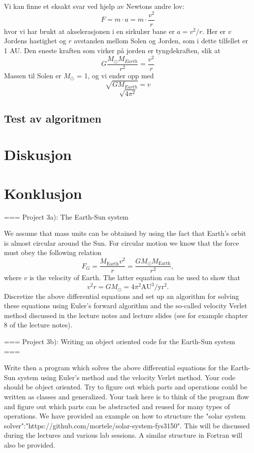 \documentclass[11pt,a4paper]{article}
\begin{document}
Vi kan finne et eksakt svar ved hjelp av Newtons andre lov:
\[F = m\cdot a = m \cdot\frac{v^2}{r} \]
hvor vi har brukt at akselerasjonen i en sirkulær bane er $a=v^2/r$. Her er $v$ Jordens hastighet og $r$ avstanden mellom Solen og Jorden, som i dette tilfellet er 1 AU. Den eneste kraften som virker på jorden er tyngdekraften, slik at
\[G \frac{M_{\odot}M_{Earth}}{r^2} = \frac{v^2}{r} \]
Massen til Solen er $M_{\odot}$ = 1, og vi ender opp med
\[\sqrt{GM_{Earth}} = v  \]
\[\sqrt{4\pi^2}  \]



\subsection{Test av algoritmen}

\section{Diskusjon}
\section{Konklusjon}



=== Project 3a): The Earth-Sun system 

We assume that mass units can be obtained by using the fact that Earth's orbit is almost circular around the Sun.
For circular motion we know that the force must obey the following relation
\[
F_G= \frac{M_{\mathrm{Earth}}v^2}{r}=\frac{GM_{\odot}M_{\mathrm{Earth}}}{r^2},
\]
where $v$ is the velocity of Earth. 
The latter equation can be used to show that
\[
v^2r=GM_{\odot}=4\pi^2\mathrm{AU}^3/\mathrm{yr}^2.
\]
Discretize the above differential equations and set up an algorithm for solving these equations using Euler's forward algorithm and the so-called velocity Verlet method discussed in the lecture notes and lecture slides (see for example chapter 8 of the lecture notes).

=== Project 3b): Writing an object oriented code for the Earth-Sun system ===

Write then a program which solves the above differential equations for the Earth-Sun system
using Euler's  method and the velocity Verlet method. 
Your code should be object oriented. Try to figure out which parts and operations could be written as classes
and generalized.  
Your task here is to think of the program flow and figure out which parts can be abstracted and reused for many types of operations. We have provided an example on how to structure
the "solar system solver":"https://github.com/mortele/solar-system-fys3150". This will be discussed during the lectures and various lab sessions. A similar structure in Fortran will also be provided. 
\end{document}
